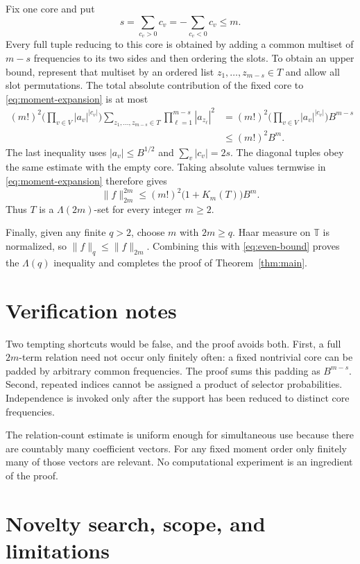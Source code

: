 \documentclass[11pt]{article}
\newcommand{\Torus}{\mathbb T}
\newcommand{\1}{\mathbf 1}
\begin{document}
Fix one core and put
\[
 s=\sum_{c_v>0}c_v=-\sum_{c_v<0}c_v\leq m.
\]
Every full tuple reducing to this core is obtained by adding a common multiset
of $m-s$ frequencies to its two sides and then ordering the slots. To obtain
an upper bound, represent that multiset by an ordered list
$z_1,\ldots,z_{m-s}\in T$ and allow all slot permutations. The total absolute
contribution of the fixed core to \eqref{eq:moment-expansion} is at most
\begin{align*}
 (m!)^2
 \Big(\prod_{v\in V}|a_v|^{|c_v|}\Big)
 \sum_{z_1,\ldots,z_{m-s}\in T}
 \prod_{\ell=1}^{m-s}|a_{z_\ell}|^2
 &=(m!)^2
 \Big(\prod_{v\in V}|a_v|^{|c_v|}\Big)B^{m-s} \\
 &\leq(m!)^2B^m.
\end{align*}
The last inequality uses $|a_v|\leq B^{1/2}$ and
$\sum_v|c_v|=2s$. The diagonal tuples obey the same estimate with the empty
core. Taking absolute values termwise in \eqref{eq:moment-expansion} therefore
gives
\begin{equation}\label{eq:even-bound}
 \|f\|_{2m}^{2m}
 \leq (m!)^2\bigl(1+K_m(T)\bigr)B^m.
\end{equation}
Thus $T$ is a $\Lambda(2m)$-set for every integer $m\geq2$.

Finally, given any finite $q>2$, choose $m$ with $2m\geq q$. Haar measure on
$\Torus$ is normalized, so $\|f\|_q\leq\|f\|_{2m}$. Combining this with
\eqref{eq:even-bound} proves the $\Lambda(q)$ inequality and completes the
proof of Theorem~\ref{thm:main}.

\section{Verification notes}

Two tempting shortcuts would be false, and the proof avoids both. First, a
full $2m$-term relation need not occur only finitely often: a fixed nontrivial
core can be padded by arbitrary common frequencies. The proof sums this padding
as $B^{m-s}$. Second, repeated indices cannot be assigned a product of selector
probabilities. Independence is invoked only after the support has been reduced
to distinct core frequencies.

The relation-count estimate is uniform enough for simultaneous use because
there are countably many coefficient vectors. For any fixed moment order only
finitely many of those vectors are relevant. No computational experiment is
an ingredient of the proof.

\section{Novelty search, scope, and limitations}
\end{document}

